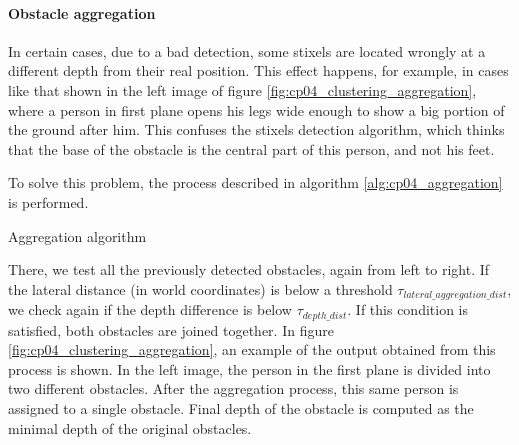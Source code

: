 \paragraph{Obstacle aggregation}\label{ch:chapter04_01_04_01_01}

In certain cases, due to a bad detection, some stixels are located wrongly at a different depth from their real position. This effect happens, for example, in cases like that shown in the left image of figure \ref{fig:cp04_clustering_aggregation}, where a person in first plane opens his legs wide enough to show a big portion of the ground after him. This confuses the stixels detection algorithm, which thinks that the base of the obstacle is the central part of this person, and not his feet.

To solve this problem, the process described in algorithm \ref{alg:cp04_aggregation} is performed.

\begin{algorithm}
\caption{Aggregation algorithm}
\label{alg:cp04_aggregation}
\begin{algorithmic}

    \EndIf
  \EndFor
\EndFunction
\end{algorithmic}
\end{algorithm}

There, we test all the previously detected obstacles, again from left to right. If the lateral distance (in world coordinates) is below a threshold $\tau_{lateral\_aggregation\_dist}$, we check again if the depth difference is below $\tau_{depth\_dist}$. If this condition is satisfied, both obstacles are joined together. In figure \ref{fig:cp04_clustering_aggregation}, an example of the output obtained from this process is shown. In the left image, the person in the first plane is divided into two different obstacles. After the aggregation process, this same person is assigned to a single obstacle. Final depth of the obstacle is computed as the minimal depth of the original obstacles.

